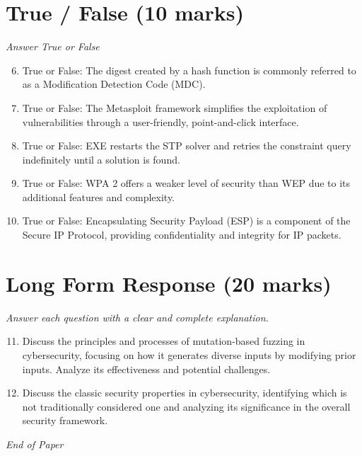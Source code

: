 \documentclass[12pt]{article}
\begin{document}
\section*{True / False (10 marks)}
\textit{Answer True or False}
\begin{enumerate}[label=\arabic*.]
\setcounter{enumi}{5}
\item True or False: The digest created by a hash function is commonly referred to as a Modification Detection Code (MDC).
\item True or False: The Metasploit framework simplifies the exploitation of vulnerabilities through a user-friendly, point-and-click interface.
\item True or False: EXE restarts the STP solver and retries the constraint query indefinitely until a solution is found.
\item True or False: WPA 2 offers a weaker level of security than WEP due to its additional features and complexity.
\item True or False: Encapsulating Security Payload (ESP) is a component of the Secure IP Protocol, providing confidentiality and integrity for IP packets.
\end{enumerate}

\section*{Long Form Response (20 marks)}
\textit{Answer each question with a clear and complete explanation.}
\begin{enumerate}[label=\arabic*.]
\setcounter{enumi}{10}
\item Discuss the principles and processes of mutation-based fuzzing in cybersecurity, focusing on how it generates diverse inputs by modifying prior inputs. Analyze its effectiveness and potential challenges.
\item Discuss the classic security properties in cybersecurity, identifying which is not traditionally considered one and analyzing its significance in the overall security framework.
\end{enumerate}

\vfill
\noindent\textit{End of Paper}
\end{document}
